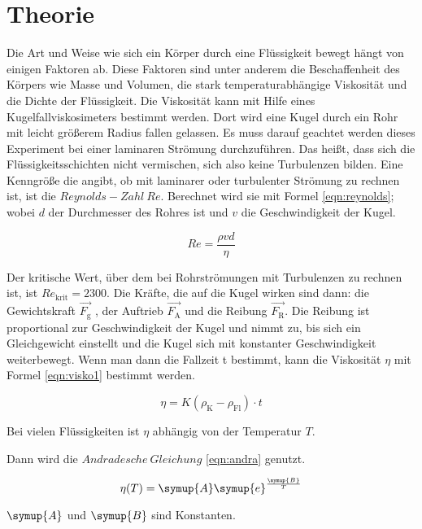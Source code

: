 \section{Theorie}
\label{sec:Theorie}

Die Art und Weise wie sich ein Körper durch eine Flüssigkeit
bewegt hängt von einigen Faktoren ab. Diese Faktoren sind unter anderem
 die Beschaffenheit des Körpers wie Masse und Volumen, die stark temperaturabhängige
Viskosität und die Dichte der Flüssigkeit.
Die  Viskosität kann mit Hilfe eines Kugelfallviskosimeters bestimmt werden.
Dort wird eine Kugel durch ein Rohr mit leicht größerem Radius fallen gelassen.
Es muss darauf geachtet werden dieses Experiment bei einer laminaren
Strömung durchzuführen. Das heißt, dass sich die Flüssigkeitsschichten nicht
vermischen, sich also keine Turbulenzen bilden.
Eine Kenngröße die angibt, ob mit laminarer oder turbulenter Strömung
zu rechnen ist, ist die $Reynolds-Zahl~Re$. Berechnet wird sie mit Formel
\eqref{eqn:reynolds}; wobei $d$ der Durchmesser des Rohres ist und $v$
die Geschwindigkeit der Kugel.

\begin{equation}
  Re = \frac{\rho v d}{\eta}
  \label{eqn:reynolds}
\end{equation}

Der kritische Wert, über dem bei Rohrströmungen mit Turbulenzen zu rechnen
ist, ist $Re_{\text{krit}} = 2300$.
Die Kräfte, die auf die Kugel wirken sind dann: die Gewichtskraft $\vec{F_{\text{g}}}$
, der Auftrieb $\vec{F_{\text{A}}}$ und die Reibung $\vec{F_{\text{R}}}$.
Die Reibung ist proportional zur Geschwindigkeit der Kugel und nimmt zu, bis
sich ein Gleichgewicht einstellt und die Kugel sich mit konstanter Geschwindigkeit
weiterbewegt.
Wenn man dann die Fallzeit t bestimmt, kann die Viskosität $\eta$ mit Formel
\eqref{eqn:visko1} bestimmt werden.

\begin{equation}
  \eta = K (\rho_{\text{K}}-\rho_{\text{Fl}}) \cdot t
  \label{eqn:visko1}
\end{equation}

Bei vielen Flüssigkeiten ist $\eta$ abhängig von der Temperatur $T$.

Dann
wird die $Andradesche~Gleichung$ \eqref{eqn:andra} genutzt.

\begin{equation}
  \eta(T) = \symup{A} \symup{e}^{\frac{\symup{B}}{T}}
  \label{eqn:andra}
\end{equation}

$\symup{A}$ und $\symup{B}$ sind Konstanten.

